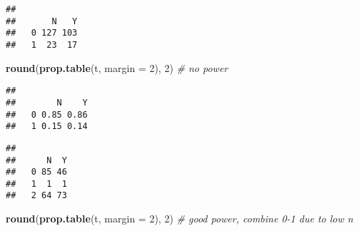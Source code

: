 \documentclass[
]{article}
\newenvironment{Shaded}{\begin{snugshade}}{\end{snugshade}}
\newcommand{\AttributeTok}[1]{\textcolor[rgb]{0.13,0.29,0.53}{#1}}
\newcommand{\CommentTok}[1]{\textcolor[rgb]{0.56,0.35,0.01}{\textit{#1}}}
\newcommand{\DecValTok}[1]{\textcolor[rgb]{0.00,0.00,0.81}{#1}}
\newcommand{\FunctionTok}[1]{\textcolor[rgb]{0.13,0.29,0.53}{\textbf{#1}}}
\newcommand{\NormalTok}[1]{#1}
\newcommand{\OtherTok}[1]{\textcolor[rgb]{0.56,0.35,0.01}{#1}}
\newcommand{\SpecialCharTok}[1]{\textcolor[rgb]{0.81,0.36,0.00}{\textbf{#1}}}
\newcommand{\StringTok}[1]{\textcolor[rgb]{0.31,0.60,0.02}{#1}}
\begin{document}
\begin{verbatim}
##    
##       N   Y
##   0 127 103
##   1  23  17
\end{verbatim}

\begin{Shaded}
\begin{Highlighting}[]
\FunctionTok{round}\NormalTok{(}\FunctionTok{prop.table}\NormalTok{(t, }\AttributeTok{margin =} \DecValTok{2}\NormalTok{), }\DecValTok{2}\NormalTok{) }\CommentTok{\# no power}
\end{Highlighting}
\end{Shaded}

\begin{verbatim}
##    
##        N    Y
##   0 0.85 0.86
##   1 0.15 0.14
\end{verbatim}

\begin{Shaded}
\end{Shaded}

\begin{verbatim}
##    
##      N  Y
##   0 85 46
##   1  1  1
##   2 64 73
\end{verbatim}

\begin{Shaded}
\begin{Highlighting}[]
\FunctionTok{round}\NormalTok{(}\FunctionTok{prop.table}\NormalTok{(t, }\AttributeTok{margin =} \DecValTok{2}\NormalTok{), }\DecValTok{2}\NormalTok{) }\CommentTok{\# good power, combine 0{-}1 due to low n}
\end{Highlighting}
\end{Shaded}
\end{document}

